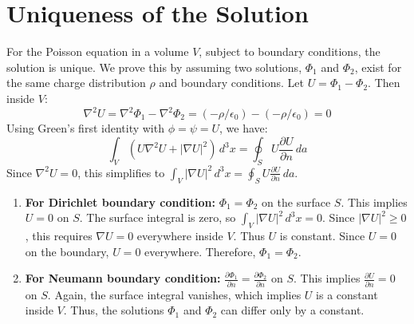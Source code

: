 \documentclass[12pt, a4paper]{article}
\begin{document}
	\section{Uniqueness of the Solution}
	For the Poisson equation in a volume $V$, subject to boundary conditions, the solution is unique. We prove this by assuming two solutions, $\Phi_1$ and $\Phi_2$, exist for the same charge distribution $\rho$ and boundary conditions. Let $U = \Phi_1 - \Phi_2$. Then inside $V$:
	\begin{equation*}
		\nabla^2 U = \nabla^2\Phi_1 - \nabla^2\Phi_2 = (-\rho/\epsilon_0) - (-\rho/\epsilon_0) = 0
	\end{equation*}
	Using Green's first identity with $\phi=\psi=U$, we have:
	\begin{equation*}
		\int_V (U\nabla^2U + |\nabla U|^2) \,d^3x = \oint_S U \frac{\partial U}{\partial n} \,da
	\end{equation*}
	Since $\nabla^2 U = 0$, this simplifies to $\int_V |\nabla U|^2 \,d^3x = \oint_S U \frac{\partial U}{\partial n} \,da$.
	\begin{enumerate}
		\item \textbf{For Dirichlet boundary condition:} $\Phi_1 = \Phi_2$ on the surface $S$. This implies $U=0$ on $S$. The surface integral is zero, so $\int_V |\nabla U|^2 \,d^3x = 0$. Since $|\nabla U|^2 \ge 0$, this requires $\nabla U = 0$ everywhere inside $V$. Thus $U$ is constant. Since $U=0$ on the boundary, $U=0$ everywhere. Therefore, $\Phi_1 = \Phi_2$.
		\item \textbf{For Neumann boundary condition:} $\frac{\partial\Phi_1}{\partial n} = \frac{\partial\Phi_2}{\partial n}$ on $S$. This implies $\frac{\partial U}{\partial n}=0$ on $S$. Again, the surface integral vanishes, which implies $U$ is a constant inside $V$. Thus, the solutions $\Phi_1$ and $\Phi_2$ can differ only by a constant.
	\end{enumerate}
	
\end{document}
